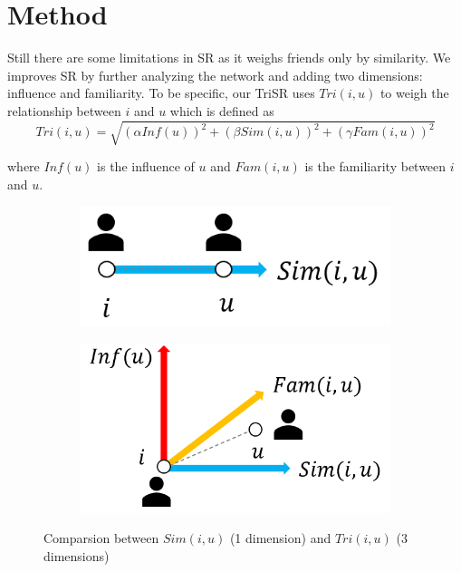 \documentclass{article}
\begin{document}
\section{Method}
\label{method}
Still there are some limitations in SR as it weighs friends only by similarity. 
We improves SR by further analyzing the network and adding two dimensions: influence and familiarity. To be specific, 
our TriSR uses $Tri(i, u)$ to weigh the relationship between $i$ and $u$ which is defined as \\
\begin{equation}
  Tri(i, u) = \sqrt{(\alpha {Inf}(u))^2 + (\beta {Sim}(i, u))^2 + (\gamma {Fam}(i, u))^2 }
\end{equation}

where ${Inf}(u)$ is the influence of $u$ and $Fam(i, u)$ is the familiarity between $i$ and $u$. 
\begin{figure}[h]    
  \centering
  \begin{subfigure}{0.26\textwidth}
    \centering
      \includegraphics[width=1\linewidth]{pic/figure3_1.png}
  \end{subfigure}%
  \begin{subfigure}{0.26\textwidth}
  \centering
      \includegraphics[width=1\linewidth]{pic/figure3_2.png}
  \end{subfigure}%
\caption{Comparsion between $Sim(i,u)$ (1 dimension) and $Tri(i,u)$ (3 dimensions)}
\end{figure}
\end{document}
